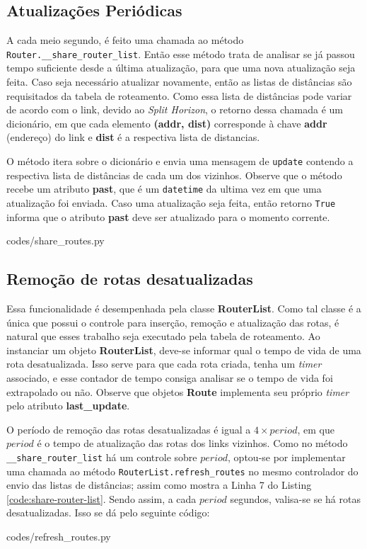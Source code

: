 \subsection{Atualizações Periódicas}
A cada meio segundo, é feito uma chamada ao método \texttt{Router.\_\_share\_router\_list}.
Então esse método trata de analisar se já passou tempo suficiente desde a
última atualização, para que uma nova atualização seja feita.
Caso seja necessário atualizar novamente, então as listas de distâncias 
são requisitados da tabela de roteamento.
Como essa lista de distâncias pode variar de acordo com o link, devido ao
\textit{Split Horizon}, o retorno dessa chamada é um dicionário, em que cada
elemento \textbf{(addr, dist)} corresponde à chave \textbf{addr} (endereço) do
link e \textbf{dist} é a respectiva lista de distancias.

O método itera sobre o dicionário e envia uma mensagem de \texttt{update}
contendo a respectiva lista de distâncias de cada um dos vizinhos.
Observe que o método recebe um atributo \textbf{past}, que é um
\texttt{datetime} da ultima vez em que uma atualização foi enviada.
Caso uma atualização seja feita, então retorno \texttt{True} informa que o
atributo \textbf{past} deve ser atualizado para o momento corrente.


{codes/share_routes.py}

\subsection{Remoção de rotas desatualizadas}
Essa funcionalidade é desempenhada pela classe \textbf{RouterList}.
Como tal classe é a única que possui o controle para inserção, remoção e
atualização das rotas, é natural que esses trabalho seja executado pela tabela
de roteamento.
Ao instanciar um objeto \textbf{RouterList}, deve-se informar qual o tempo de
vida de uma rota desatualizada.
Isso serve para que cada rota criada, tenha um \textit{timer} associado, e esse
contador de tempo consiga analisar se o tempo de vida foi extrapolado ou não.
Observe que objetos \textbf{Route} implementa seu próprio \textit{timer} pelo
atributo \textbf{last\_update}.

O período de remoção das rotas desatualizadas é igual a $4 \times period$, em
que $period$ é o tempo de atualização das rotas dos links vizinhos.
Como no método \texttt{\_\_share\_router\_list} há um controle sobre $period$,
optou-se por implementar uma chamada ao método \texttt{RouterList.refresh\_routes}
no mesmo controlador do envio das listas de distâncias; assim como mostra a
Linha 7 do Listing \ref{code:share-router-list}.
Sendo assim, a cada $period$ segundos, valisa-se se há rotas desatualizadas.
Isso se dá pelo seguinte código:

{codes/refresh_routes.py}

